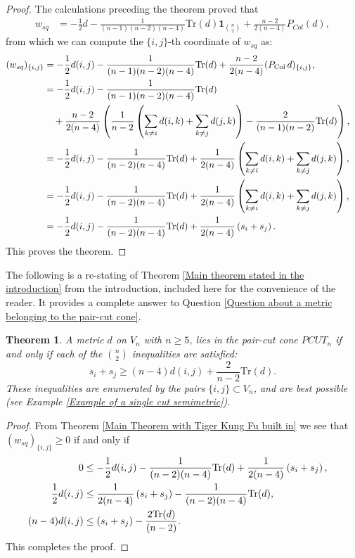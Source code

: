 \documentclass[12pt]{amsart}
\newtheorem{theorem}{Theorem}
\numberwithin{theorem}{section}
\theoremstyle{remark}
\begin{document}
\begin{proof}
The calculations preceding the theorem proved that 
\begin{align*}
w_{sq} & =  -\frac{1}{2}d - \frac{1}{(n-1)(n-2)(n-4)}\text{Tr}(d) \mathbf{1}_{n\choose 2}  + \frac{n-2}{2(n-4)} P_{Col}(d),
\end{align*}
from which we can compute the $\{i,j\}$-th coordinate of $w_{sq}$ as:  	
\begin{align*}
(w_{sq})_{\{i,j\}} & = -\frac{1}{2} d(i,j) -\frac{1}{(n-1)(n-2)(n-4)} \text{Tr}(d)  + \frac{n-2}{2(n-4)} (P_{\text{Col}}\, d)_{\{i,j\}}, \cr	
& = -\frac{1}{2} d(i,j) -\frac{1}{(n-1)(n-2)(n-4)} \text{Tr}(d) \cr
& \quad  + \frac{n-2}{2(n-4)} \left( \frac{1}{n-2} \left(\sum_{k\ne i} d(i,k) + \sum_{k\ne j} d(j,k) \right) - \frac{2}{(n-1)(n-2)} \text{Tr}(d)\right), \cr	
& = -\frac{1}{2} d(i,j) -\frac{1}{(n-2)(n-4)} \text{Tr}(d) + \frac{1}{2(n-4)}  \left(\sum_{k\ne i} d(i,k) + \sum_{k\ne j} d(j,k) \right), \cr	
& = -\frac{1}{2} d(i,j) -\frac{1}{(n-2)(n-4)} \text{Tr}(d) + \frac{1}{2(n-4)}  \left(\sum_{k\ne i} d(i,k) + \sum_{k\ne j} d(j,k) \right), \cr	
& = -\frac{1}{2} d(i,j) -\frac{1}{(n-2)(n-4)} \text{Tr}(d) + \frac{1}{2(n-4)}  \left(s_i + s_j \right).
\end{align*}
This proves the theorem.   	
\end{proof}
The following is a re-stating of Theorem \ref{Main theorem stated in the introduction} from the introduction, included here for the convenience of the reader. It provides a complete answer to Question \ref{Question about a metric belonging to the pair-cut cone}.
\begin{theorem} \label{Main inequalitis on star-traces and traces of metrics in the pair-cut-cone}
A metric $d$ on $V_n$ with $n\ge 5$, lies in the pair-cut cone $PCUT_n$ if and only if each of the ${n\choose 2}$ inequalities are satisfied:  
\begin{equation} \label{Main inequality for the coordinates of wsq to be nonnegative}
 s_i + s_j\ge (n-4)d(i,j) + \frac{2}{n-2}\text{Tr}(d). 
\end{equation}
These inequalities are enumerated by the pairs $\{i,j\}\subset V_n$, and are best possible (see Example \ref{Example of a single cut semimetric}).
\end{theorem}
\begin{proof} 
From Theorem \ref{Main Theorem with Tiger Kung Fu built in} we see that $(w_{sq})_{\{i,j\}}\ge 0$ if and only if 
\begin{align*}
0 &\le -\frac{1}{2} d(i,j) -\frac{1}{(n-2)(n-4)} \text{Tr}(d) + \frac{1}{2(n-4)}  \left(s_i + s_j \right), \cr	
\frac{1}{2} d(i,j) & \le \frac{1}{2(n-4)}\left(s_i + s_j \right) -\frac{1}{(n-2)(n-4)} \text{Tr}(d), \cr
(n-4)  d(i,j) & \le \left(s_i + s_j \right) -\frac{2\text{Tr}(d) }{(n-2)} .
\end{align*}
This completes the proof. 
\end{proof}
\end{document}
